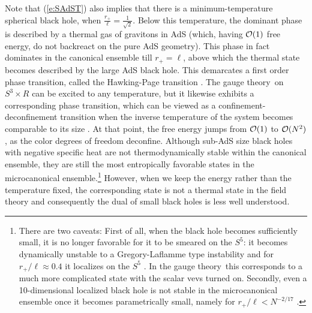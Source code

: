 \documentclass[12pt]{article}
\def\req#1{(\ref{#1})}
\def\GT{gauge theory}
\def\Rads{\ell}
\def\rh{r_+}
\begin{document}
Note that \req{e:SAdST} also implies that there is a minimum-temperature spherical black hole, when  $\frac{\rh}{\Rads} = \frac{1}{\sqrt{2}}$. Below this temperature, the dominant phase is described by a thermal gas of gravitons in AdS (which, having ${\cal O}(1)$ free energy, do not backreact on the pure AdS geometry).  This phase in fact dominates in the canonical ensemble till $\rh = \Rads$, above which the thermal state becomes described by the large AdS black hole.  This demarcates a first order phase transition, called the Hawking-Page transition \cite{Hawking:1982dh}.  
The \GT\ on $S^3 \times R$ can be excited to any temperature, but it likewise exhibits a corresponding phase transition, which can be viewed as a confinement-deconfinement  transition when the inverse temperature of the system becomes comparable to its size \cite{Witten:1998zw}.  At that point, the free energy jumps from ${\cal O}(1)$ 
 to ${\cal O}(N^2)$,  as the color degrees of freedom deconfine. 
Although sub-AdS size black holes with negative specific heat are not thermodynamically stable within the canonical ensemble, they are still the most entropically favorable states in the microcanonical ensemble.\footnote{
There are two caveats:  First of all, when the black hole becomes sufficiently small, it is no longer favorable for it to be smeared on the $S^5$: it becomes dynamically unstable to a Gregory-Laflamme type instability  \cite{Gregory:1993vy} and for $\rh/\Rads \approx 0.4$ it localizes on the $S^5$ \cite{Hubeny:2002xn}.  In the \GT\ this corresponds to a much more complicated state with the scalar vevs turned on.  Secondly, even  a 10-dimensional localized  black hole is not stable in the microcanonical ensemble once it becomes parametrically small, namely for $\rh/\Rads < N^{-2/17} $ \cite{Horowitz:1999uv}.
}  
However, when we keep the energy rather than the temperature fixed, the corresponding state is not a thermal state in the field theory and consequently the dual of small black holes is less well understood.
\end{document}
